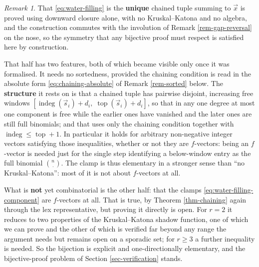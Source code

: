 \documentclass[11pt, a4paper, abstract=yes]{scrartcl}
\theoremstyle{definition}
\theoremstyle{remark}
\newtheorem{remark}[definition]{Remark}
\theoremstyle{plain}
\newcommand{\indeg}{\operatorname{indeg}}
\newcommand{\tp}{\operatorname{top}}
\begin{document}
\begin{remark}
That \eqref{eq:water-filling} is the \textbf{unique} chained tuple
summing to \(\vec x\) is proved using downward closure alone, with no Kruskal--Katona and no
algebra, and the construction commutes with the involution of Remark \ref{rem-gap-reversal} on the
nose, so the
symmetry that any bijective proof must respect is satisfied here by construction.

That half has two features, both of which became visible only once it was formalised. It needs no
sortedness, provided the chaining condition is read in the absolute form
\eqref{eq:chaining-absolute} of Remark \ref{rem-sorted} below. The \textbf{structure} it rests on is that a
chained tuple has pairwise disjoint, increasing free windows
\([\indeg(\vec s_i)+d_i,\;\tp(\vec s_i)+d_i]\), so that in any one degree at most one component is
free while the earlier ones have vanished and the later ones are still full binomials; and that uses
only the chaining condition together with \(\indeg\le\tp+1\). In particular it holds for arbitrary non-negative integer vectors satisfying those
inequalities, whether or not they are \(f\)-vectors: being an \(f\)-vector is needed just for the
single step identifying a below-window entry as the full binomial \(\binom n{\cdot}\). The clamp is
thus elementary in a stronger sense than ``no Kruskal--Katona'': most of it is not about \(f\)-vectors
at all.

What is \textbf{not} yet combinatorial is the other half: that the clamps \eqref{eq:water-filling-component} are
\(f\)-vectors at all. That is true, by Theorem \ref{thm-chaining} again through the lex
representative, but proving it directly is open. For \(r=2\) it reduces to two properties of the
Kruskal--Katona shadow function, one of which we can prove and the other of which is verified far
beyond any range the argument needs but remains open on a sporadic set; for \(r\ge3\) a further
inequality is needed. So the bijection is explicit and one-directionally elementary, and the
bijective-proof problem of Section \ref{sec-verification} stands.
\label{rem-explicit-inverse}
\end{remark}
\end{document}
